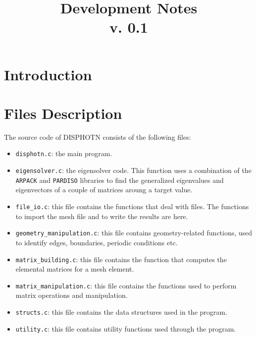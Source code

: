 \documentclass[11pt,a4paper,oneside]{article}
\begin{document}
\title{Development Notes\\{\small v. 0.1}}
\maketitle
\newpage
\tableofcontents
\newpage

\section{Introduction}

\section{Files Description}
The source code of DISPHOTN consists of the following files:
\begin{itemize}
\item {\tt disphotn.c}: the main program.
\item {\tt eigensolver.c}: the eigensolver code. This function uses a combination of the {\tt ARPACK} and {\tt PARDISO} libraries to find the generalized eigenvalues and eigenvectors of a couple of matrices aroung a target value.
\item {\tt file\_io.c}: this file contains the functions that deal with files. The functions to import the mesh file and to write the results are here.
\item {\tt geometry\_manipulation.c}: this file contains geometry-related functions, used to identify edges, boundaries, periodic conditions etc.
\item {\tt matrix\_building.c}: this file contains the function that computes the elemental matrices for a mesh element.
\item {\tt matrix\_manipulation.c}: this file contains the functions used to perform matrix operations and manipulation.
\item {\tt structs.c}: this file contains the data structures used in the program.
\item {\tt utility.c}: this file contains utility functions used through the program.
\end{itemize}
\end{document}
